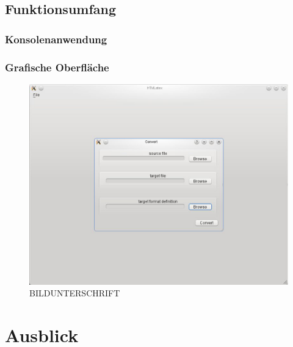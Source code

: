 \documentclass[	a4paper,		%
		titlepage, 		%
		fontsize=12pt		%
		]{scrartcl} 		%
\begin{document}
\subsection{Funktionsumfang}

\subsubsection{Konsolenanwendung}

\subsubsection{Grafische Oberfläche}
\begin{figure} [H]
    \centering
	\includegraphics[width=.5\textwidth, keepaspectratio]{./img/screenshot.eps}
    \caption{BILDUNTERSCHRIFT}
\end{figure}


\begin{figure} [H]
\centering
\resizebox*{.70\textheight}{!}{}
\end{figure}
\section{Ausblick}




%
\end{document}
